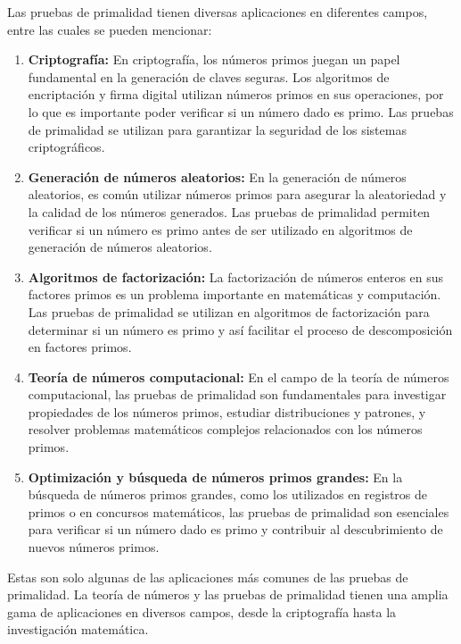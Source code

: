 Las pruebas de primalidad tienen diversas aplicaciones en diferentes campos, entre las cuales se pueden mencionar:

\begin{enumerate}
	\item \textbf{Criptografía:} En criptografía, los números primos juegan un papel fundamental en la generación de claves seguras. Los algoritmos de encriptación y firma digital utilizan números primos en sus operaciones, por lo que es importante poder verificar si un número dado es primo. Las pruebas de primalidad se utilizan para garantizar la seguridad de los sistemas criptográficos.
	
	\item \textbf{Generación de números aleatorios:} En la generación de números aleatorios, es común utilizar números primos para asegurar la aleatoriedad y la calidad de los números generados. Las pruebas de primalidad permiten verificar si un número es primo antes de ser utilizado en algoritmos de generación de números aleatorios.
	
	\item \textbf{Algoritmos de factorización:} La factorización de números enteros en sus factores primos es un problema importante en matemáticas y computación. Las pruebas de primalidad se utilizan en algoritmos de factorización para determinar si un número es primo y así facilitar el proceso de descomposición en factores primos.
	
	\item \textbf{Teoría de números computacional:} En el campo de la teoría de números computacional, las pruebas de primalidad son fundamentales para investigar propiedades de los números primos, estudiar distribuciones y patrones, y resolver problemas matemáticos complejos relacionados con los números primos.
	
	\item \textbf{Optimización y búsqueda de números primos grandes:} En la búsqueda de números primos grandes, como los utilizados en registros de primos o en concursos matemáticos, las pruebas de primalidad son esenciales para verificar si un número dado es primo y contribuir al descubrimiento de nuevos números primos.
	
\end{enumerate}

Estas son solo algunas de las aplicaciones más comunes de las pruebas de primalidad. La teoría de números y las pruebas de primalidad tienen una amplia gama de aplicaciones en diversos campos, desde la criptografía hasta la investigación matemática. 
